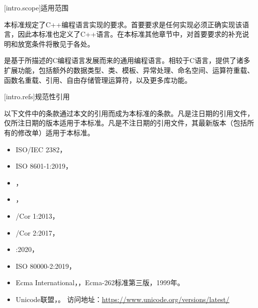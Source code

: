 
[intro.scope]{适用范围}

\pnum
{}%
本标准规定了C++编程语言实现的要求。首要要求是任何实现必须正确实现该语言，因此本标准也定义了C++语言。在本标准其他章节中，对首要要求的补充说明和放宽条件将散见于各处。

\pnum
\Cpp{}是基于\IsoC{}所描述的C编程语言发展而来的通用编程语言。相较于C语言，\Cpp{}提供了诸多扩展功能，包括额外的数据类型、类、模板、异常处理、命名空间、运算符重载、函数名重载、引用、自由存储管理运算符，以及更多库功能。%

[intro.refs]{规范性引用}%
%

\pnum
{}%
以下文件中的条款通过本文的引用而成为本标准的条款。凡是注日期的引用文件，仅所注日期的版本适用于本标准。凡是不注日期的引用文件，其最新版本（包括所有的修改单）适用于本标准。
\begin{itemize}
\item ISO/IEC 2382，
\item ISO 8601-1:2019，
\item \IsoC{}，
\item \IsoPosix{}，
\item \IsoPosix{}/Cor 1:2013，
\item \IsoPosix{}/Cor 2:2017，
\item \IsoFloatUndated{}:2020，
\item ISO 80000-2:2019，
\item Ecma International，，Ecma-262标准第三版，1999年。
\item
Unicode联盟，。
访问地址：\url{https://www.unicode.org/versions/latest/}
\end{itemize}

